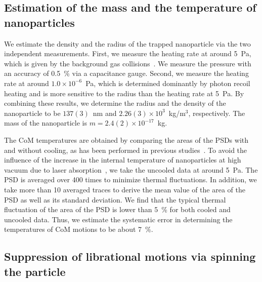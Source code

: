 \documentclass[aps, prl, 
amsmath, showpacs, preprintnumbers, twocolumn, amssymb, amsmath, superscriptaddress]{revtex4-1}
\begin{document}


\subsection{Estimation of the mass and the temperature of nanoparticles}

We estimate the density and the radius of the trapped nanoparticle via the two independent measurements. First, we measure the heating rate at around 5~Pa, which is given by the background gas collisions~\cite{gieseler2012subkelvin,vovrosh2017parametric,iwasaki2019electric}. We measure the pressure with an accuracy of 0.5~\% via a capacitance gauge. Second, we measure the heating rate at around $1.0 \times 10^{-6}$~Pa, which is determined dominantly by photon recoil heating and is more sensitive to the radius than the heating rate at 5~Pa. By combining these results, we determine the radius and the density of the nanoparticle to be $137(3)$~nm and $2.26(3) \times 10^3$~kg/m$^3$, respectively. The mass of the nanoparticle is $m=2.4(2)  \times 10^{-17}$~kg.


The CoM temperatures are obtained by comparing the areas of the PSDs with and without cooling, as has been performed in previous studies~\cite{gieseler2012subkelvin,vovrosh2017parametric,iwasaki2019electric}. To avoid the influence of the increase in the internal temperature of nanoparticles at high vacuum due to laser absorption~\cite{hebestreit2018measuring}, we take the uncooled data at around 5~Pa. The PSD is averaged over 400 times to minimize thermal fluctuations. In addition, we take more than 10 averaged traces to derive the mean value of the area of the PSD as well as its standard deviation. We find that the typical thermal fluctuation of the area of the PSD is lower than 5~\% for both cooled and uncooled data. Thus, we estimate the systematic error in determining the temperatures of CoM motions to be about 7~\%. 

\subsection{Suppression of librational motions via spinning the particle}
\end{document}
